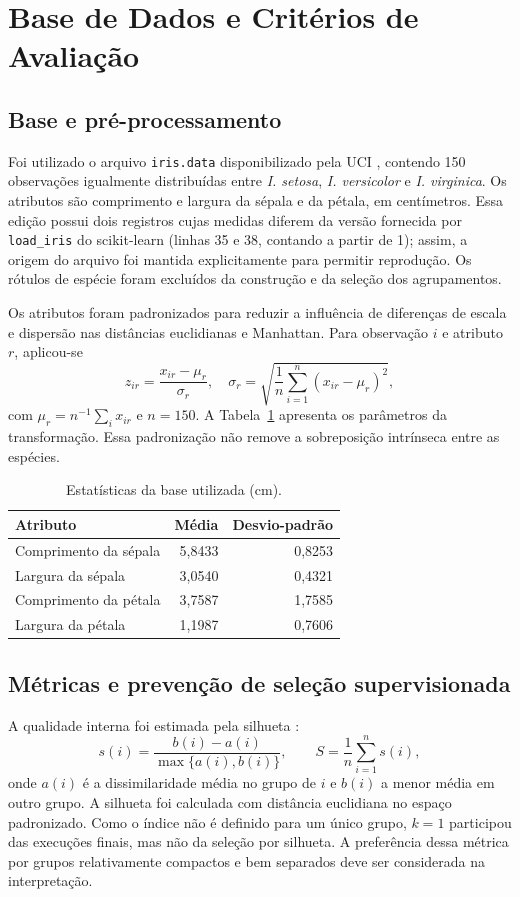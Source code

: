 \documentclass[conference,a4paper]{IEEEtran}
\begin{document}
\section{Base de Dados e Critérios de Avaliação}
\subsection{Base e pré-processamento}
Foi utilizado o arquivo \texttt{iris.data} disponibilizado pela UCI \cite{uci}, contendo 150 observações igualmente distribuídas entre \emph{I. setosa}, \emph{I. versicolor} e \emph{I. virginica}. Os atributos são comprimento e largura da sépala e da pétala, em centímetros. Essa edição possui dois registros cujas medidas diferem da versão fornecida por \texttt{load\_iris} do scikit-learn (linhas 35 e 38, contando a partir de 1); assim, a origem do arquivo foi mantida explicitamente para permitir reprodução. Os rótulos de espécie foram excluídos da construção e da seleção dos agrupamentos.

Os atributos foram padronizados para reduzir a influência de diferenças de escala e dispersão nas distâncias euclidianas e Manhattan. Para observação $i$ e atributo $r$, aplicou-se
\begin{equation}
 z_{ir}=\frac{x_{ir}-\mu_r}{\sigma_r},\quad
 \sigma_r=\sqrt{\frac{1}{n}\sum_{i=1}^{n}(x_{ir}-\mu_r)^2},
 \label{eq:zscore}
\end{equation}
com $\mu_r=n^{-1}\sum_i x_{ir}$ e $n=150$. A Tabela~\ref{tab:estatisticas} apresenta os parâmetros da transformação. Essa padronização não remove a sobreposição intrínseca entre as espécies.
\begin{table}[!t]
\caption{Estatísticas da base utilizada (cm).}
\label{tab:estatisticas}
\centering\footnotesize
\begin{tabular}{lrr}
\toprule
Atributo & Média & Desvio-padrão\\
\midrule
Comprimento da sépala & 5,8433 & 0,8253\\
Largura da sépala & 3,0540 & 0,4321\\
Comprimento da pétala & 3,7587 & 1,7585\\
Largura da pétala & 1,1987 & 0,7606\\
\bottomrule
\end{tabular}
\end{table}

\subsection{Métricas e prevenção de seleção supervisionada}
A qualidade interna foi estimada pela silhueta \cite{rousseeuw}:
\begin{equation}
 s(i)=\frac{b(i)-a(i)}{\max\{a(i),b(i)\}},
 \qquad S=\frac{1}{n}\sum_{i=1}^{n}s(i),
 \label{eq:sil}
\end{equation}
onde $a(i)$ é a dissimilaridade média no grupo de $i$ e $b(i)$ a menor média em outro grupo. A silhueta foi calculada com distância euclidiana no espaço padronizado. Como o índice não é definido para um único grupo, $k=1$ participou das execuções finais, mas não da seleção por silhueta. A preferência dessa métrica por grupos relativamente compactos e bem separados deve ser considerada na interpretação.
\end{document}

